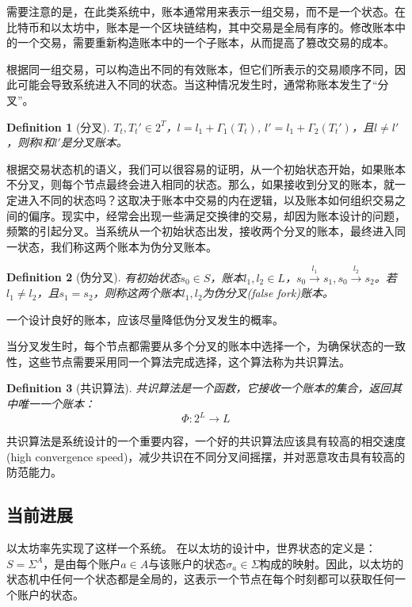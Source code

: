 \documentclass[UTF8,nofonts]{ctexart}
\newtheorem{definition}{Definition}[section]
\begin{document}
\begin{multicols}{2}
需要注意的是，在此类系统中，账本通常用来表示一组交易，而不是一个状态。在比特币\cite{nakamoto2008bitcoin}和以太坊\cite{wood2014ethereum}中，账本是一个区块链结构，其中交易是全局有序的。修改账本中的一个交易，需要重新构造账本中的一个子账本，从而提高了篡改交易的成本。

根据同一组交易，可以构造出不同的有效账本，但它们所表示的交易顺序不同，因此可能会导致系统进入不同的状态。当这种情况发生时，通常称账本发生了“分叉”。
\begin{definition}[分叉] \label{def:fork}
$T_{t},{T_{t}}' \in 2^{T}$，$l=l_{1} + \Gamma_{1}(T_{t})$, ${l}'=l_{1}+\Gamma_{2}({T_{t}}')$，且$l \neq {l}'$，则称$l$和${l}'$是分叉账本。 
\end{definition}

根据交易状态机的语义，我们可以很容易的证明，从一个初始状态开始，如果账本不分叉，则每个节点最终会进入相同的状态。那么，如果接收到分叉的账本，就一定进入不同的状态吗？这取决于账本中交易的内在逻辑，以及账本如何组织交易之间的偏序。现实中，经常会出现一些满足交换律的交易，却因为账本设计的问题，频繁的引起分叉。当系统从一个初始状态出发，接收两个分叉的账本，最终进入同一状态，我们称这两个账本为伪分叉账本。

\begin{definition}[伪分叉] \label{def:falsefork}
有初始状态$s_{0} \in S$，账本$l_{1},l_{2} \in L$，$s_{0}\overset{l_{1}}{\rightarrow}s_{1}, s_{0}\overset{l_{2}}{\rightarrow}s_{2}$。若$l_{1} \neq l_{2}$，且$s_{1}=s_{2}$，则称这两个账本$l_{1} ,l_{2}$为伪分叉(false fork)账本。
\end{definition}

一个设计良好的账本，应该尽量降低伪分叉发生的概率。

当分叉发生时，每个节点都需要从多个分叉的账本中选择一个，为确保状态的一致性，这些节点需要采用同一个算法完成选择，这个算法称为共识算法。

\begin{definition}[共识算法] \label{def:consensus}
共识算法是一个函数，它接收一个账本的集合，返回其中唯一一个账本：
$$\Phi: 2^{L} \rightarrow L$$
\end{definition}

共识算法是系统设计的一个重要内容，一个好的共识算法应该具有较高的相交速度(high convergence speed)，减少共识在不同分叉间摇摆，并对恶意攻击具有较高的防范能力。

\subsection{当前进展}
以太坊\cite{buterin2017ethereum}率先实现了这样一个系统。
在以太坊的设计中，世界状态的定义是：$S = \Sigma^{A}$，是由每个账户$a \in A$与该账户的状态$\sigma_{a} \in \Sigma$构成的映射。因此，以太坊的状态机中任何一个状态都是全局的，这表示一个节点在每个时刻都可以获取任何一个账户的状态。


\end{multicols}
\end{document}
